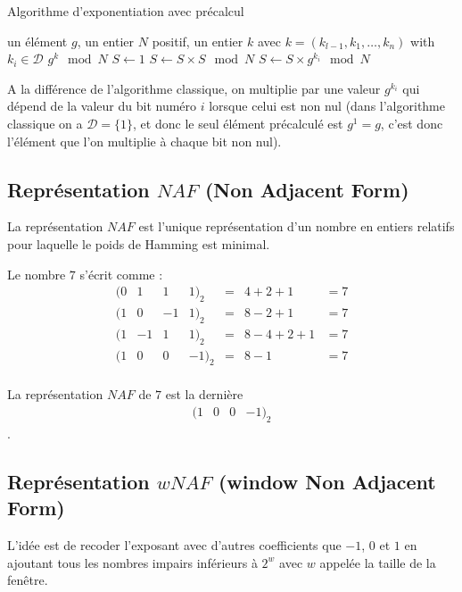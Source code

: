 \documentclass[12pt, a4paper]{memoir}
\begin{document}
\begin{algorithm}
 \caption{Algorithme d'exponentiation avec précalcul}
 \begin{algorithmic}
  \REQUIRE un élément $g$, un entier $N$ positif, un entier $k$ avec $k = (k_{l-1},k_1,\ldots,k_n)$ with $k_i \in \mathcal{D}$
  \ENSURE $g^k \mod N$
  \STATE $S \leftarrow 1$
  \STATE $S \leftarrow S \times S \mod N$
  \STATE $S \leftarrow S \times g^{k_i} \mod N$
  \ENDIF
  \ENDFOR
 \end{algorithmic}
\end{algorithm}

A la différence de l'algorithme classique, on multiplie par une valeur $g^{k_i}$ qui dépend de la valeur 
du bit numéro $i$ lorsque celui est non nul (dans l'algorithme classique on a $\mathcal{D} = \{1\}$, et donc 
le seul élément précalculé est $g^1 = g$, c'est donc l'élément que l'on multiplie à chaque bit non nul).

\subsection{Représentation $NAF$ (Non Adjacent Form)}
La représentation $NAF$ est l'unique représentation d'un nombre en entiers relatifs pour laquelle le poids de Hamming est minimal.

\begin{Exemple}
 Le nombre $7$ s'écrit comme :
 $$\begin{array}{ccccccc}
  (0 & 1 & 1 & 1)_2 & = & 4 + 2 + 1 & = 7 \\
  (1 & 0 & -1 & 1)_2 & = & 8 - 2 + 1 & = 7 \\
  (1 & -1 & 1 & 1)_2 & = & 8 - 4 + 2 + 1 & = 7 \\
  (1 & 0 & 0 & -1)_2 & = & 8 - 1 & = 7 \\
 \end{array}$$
 
 La représentation $NAF$ de $7$ est la dernière $$\begin{array}{cccc} (1 & 0 & 0 & -1)_2 \end{array}$$.
\end{Exemple}

\subsection{Représentation $wNAF$ (window Non Adjacent Form)}

L'idée est de recoder l'exposant avec d'autres coefficients que $-1$, $0$ et $1$ en ajoutant tous les nombres 
impairs inférieurs à $2^w$ avec $w$ appelée la taille de la fenêtre.
\end{document}
